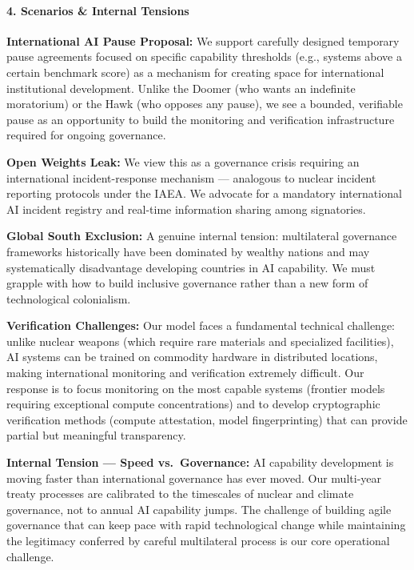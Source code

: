 \paragraph{4. Scenarios \& Internal
Tensions}\label{scenarios-internal-tensions-4}

\textbf{International AI Pause Proposal:} We support carefully designed
temporary pause agreements focused on specific capability thresholds
(e.g., systems above a certain benchmark score) as a mechanism for
creating space for international institutional development. Unlike the
Doomer (who wants an indefinite moratorium) or the Hawk (who opposes any
pause), we see a bounded, verifiable pause as an opportunity to build
the monitoring and verification infrastructure required for ongoing
governance.

\textbf{Open Weights Leak:} We view this as a governance crisis
requiring an international incident-response mechanism --- analogous to
nuclear incident reporting protocols under the IAEA. We advocate for a
mandatory international AI incident registry and real-time information
sharing among signatories.

\textbf{Global South Exclusion:} A genuine internal tension:
multilateral governance frameworks historically have been dominated by
wealthy nations and may systematically disadvantage developing countries
in AI capability. We must grapple with how to build inclusive governance
rather than a new form of technological colonialism.

\textbf{Verification Challenges:} Our model faces a fundamental
technical challenge: unlike nuclear weapons (which require rare
materials and specialized facilities), AI systems can be trained on
commodity hardware in distributed locations, making international
monitoring and verification extremely difficult. Our response is to
focus monitoring on the most capable systems (frontier models requiring
exceptional compute concentrations) and to develop cryptographic
verification methods (compute attestation, model fingerprinting) that
can provide partial but meaningful transparency.

\textbf{Internal Tension --- Speed vs.~Governance:} AI capability
development is moving faster than international governance has ever
moved. Our multi-year treaty processes are calibrated to the timescales
of nuclear and climate governance, not to annual AI capability jumps.
The challenge of building agile governance that can keep pace with rapid
technological change while maintaining the legitimacy conferred by
careful multilateral process is our core operational challenge.


